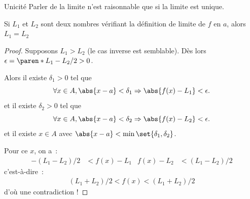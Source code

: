 \begin{frame}{Unicité}
  Parler de \og la limite\fg{} n'est raisonnable que si la limite est unique.\pause \begin{proposition}Si \(L_{1}\) et \(L_{2}\) sont deux nombres vérifiant la définition de \og limite de \(f\) en \(a\), alors \(L_{1} = L_{2}\)
  \end{proposition}
\end{frame}
\begin{frame}%
  \begin{proof}Supposons \(L_{1} > L_{2}\) (le cas inverse est semblable). Dès lors \(\epsilon = \paren*{L_{1} - L_{2}}/2 > 0\).

    Alors il existe \(\delta_{1} > 0\) tel que
    \begin{equation*}
      \forall x \in A, \abs{x-a} < \delta_{1} \Rightarrow \abs{f(x)-L_{1}} < \epsilon.
    \end{equation*}\pause
    et il existe \(\delta_{2} > 0\) tel que
    \begin{equation*}
      \forall x \in A, \abs{x-a} < \delta_{2} \Rightarrow \abs{f(x)-L_{2}} < \epsilon.
    \end{equation*}
    et il existe \(x \in A\) avec \(\abs{x-a} < \min\set{\delta_{1},\delta_{2}}\).

    Pour ce \(x\), on a~:
    \begin{align*}
      - (L_{1} - L_{2}) /2 &< f(x) - L_{1} &      f(x) - L_{2} &< (L_{1} - L_{2}) /2
    \end{align*}
    c'est-à-dire~:
    \begin{align*}
      (L_{1} + L_{2}) /2 < f(x) < (L_{1} + L_{2}) /2
    \end{align*}
    d'où une contradiction !
  \end{proof}
\end{frame}
